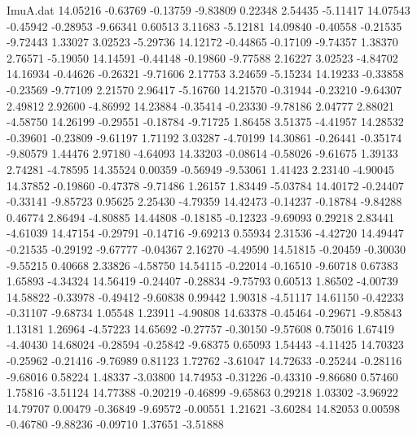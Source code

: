 \begin{filecontents}{ImuA.dat}
  14.05216   -0.63769   -0.13759   -9.83809    0.22348    2.54435   -5.11417
  14.07543   -0.45942   -0.28953   -9.66341    0.60513    3.11683   -5.12181
  14.09840   -0.40558   -0.21535   -9.72443    1.33027    3.02523   -5.29736
  14.12172   -0.44865   -0.17109   -9.74357    1.38370    2.76571   -5.19050
  14.14591   -0.44148   -0.19860   -9.77588    2.16227    3.02523   -4.84702
  14.16934   -0.44626   -0.26321   -9.71606    2.17753    3.24659   -5.15234
  14.19233   -0.33858   -0.23569   -9.77109    2.21570    2.96417   -5.16760
  14.21570   -0.31944   -0.23210   -9.64307    2.49812    2.92600   -4.86992
  14.23884   -0.35414   -0.23330   -9.78186    2.04777    2.88021   -4.58750
  14.26199   -0.29551   -0.18784   -9.71725    1.86458    3.51375   -4.41957
  14.28532   -0.39601   -0.23809   -9.61197    1.71192    3.03287   -4.70199
  14.30861   -0.26441   -0.35174   -9.80579    1.44476    2.97180   -4.64093
  14.33203   -0.08614   -0.58026   -9.61675    1.39133    2.74281   -4.78595
  14.35524    0.00359   -0.56949   -9.53061    1.41423    2.23140   -4.90045
  14.37852   -0.19860   -0.47378   -9.71486    1.26157    1.83449   -5.03784
  14.40172   -0.24407   -0.33141   -9.85723    0.95625    2.25430   -4.79359
  14.42473   -0.14237   -0.18784   -9.84288    0.46774    2.86494   -4.80885
  14.44808   -0.18185   -0.12323   -9.69093    0.29218    2.83441   -4.61039
  14.47154   -0.29791   -0.14716   -9.69213    0.55934    2.31536   -4.42720
  14.49447   -0.21535   -0.29192   -9.67777   -0.04367    2.16270   -4.49590
  14.51815   -0.20459   -0.30030   -9.55215    0.40668    2.33826   -4.58750
  14.54115   -0.22014   -0.16510   -9.60718    0.67383    1.65893   -4.34324
  14.56419   -0.24407   -0.28834   -9.75793    0.60513    1.86502   -4.00739
  14.58822   -0.33978   -0.49412   -9.60838    0.99442    1.90318   -4.51117
  14.61150   -0.42233   -0.31107   -9.68734    1.05548    1.23911   -4.90808
  14.63378   -0.45464   -0.29671   -9.85843    1.13181    1.26964   -4.57223
  14.65692   -0.27757   -0.30150   -9.57608    0.75016    1.67419   -4.40430
  14.68024   -0.28594   -0.25842   -9.68375    0.65093    1.54443   -4.11425
  14.70323   -0.25962   -0.21416   -9.76989    0.81123    1.72762   -3.61047
  14.72633   -0.25244   -0.28116   -9.68016    0.58224    1.48337   -3.03800
  14.74953   -0.31226   -0.43310   -9.86680    0.57460    1.75816   -3.51124
  14.77388   -0.20219   -0.46899   -9.65863    0.29218    1.03302   -3.96922
  14.79707    0.00479   -0.36849   -9.69572   -0.00551    1.21621   -3.60284
  14.82053    0.00598   -0.46780   -9.88236   -0.09710    1.37651   -3.51888

\end{filecontents}
